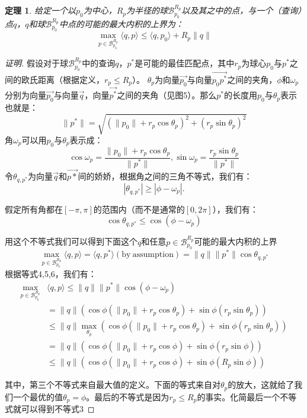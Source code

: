 \documentclass[twocolumn]{article}
\begin{document}
\newtheorem{theorem1}{定理}[section]
\begin{theorem1}
给定一个以$p_0$为中心，$R_p$为半径的球$\mathcal{B}_{p_0}^{R_p}$以及其之中的点，与一个（查询）点$q$，$q$和球$\mathcal{B}_{p_0}^{R_p}$中点的可能的最大内积的上界为：
\begin{equation}
\max_{p \in \mathcal{B}_{p_0}^{R_p}} \langle q,p \rangle \le \langle q,p_0 \rangle + R_p \|q\|
\end{equation}

\end{theorem1}
\begin{proof}[证明]
假设对于球$\mathcal{B}_{p_0}^{R_p}$中的查询$q$，$p^*$是可能的最佳匹配点，其中$r_p$为球心$p_0$与$p^*$之间的欧氏距离（根据定义，$r_p \le R_p$）。
$\theta_p$为向量$\vec{p_0}$与向量$\vec{p_0 p^*}$之间的夹角，$\phi$和$\omega_p$分别为向量$\vec{p_0}$与向量$\vec{q}$，向量$\vec{p^*}$之间的夹角（见图5）。那么$p^*$的长度用$p_0$与$\theta_p$表示也就是：
\begin{equation}
\|p^*\| = \sqrt{(\|p_0\| + r_p\cos\theta_p)^2+(r_p\sin\theta_p)^2}
\end{equation}
角$\omega_p$可以用$p_0$与$\theta_p$表示成：
\begin{equation}
\cos\omega_p = \frac{\|p_0\|+r_p\cos\theta_p}{\|p^*\|},
\sin\omega_p = \frac{r_p\sin\theta_p}{\|p^*\|}
\end{equation}
令$\theta_{q,p^*}$为向量$\vec{q}$和$\vec{p*}$间的娇娇，根据角之间的三角不等式，我们有：
\begin{equation*}
|\theta_{q,p^*}| \ge |\phi - \omega_p|.
\end{equation*}

假定所有角都在$[-\pi, \pi]$的范围内（而不是通常的$[0, 2\pi]$），我们有：
\begin{equation}
\cos\theta_{q,p^*} \le \cos(\phi - \omega_p)
\end{equation}

用这个不等式我们可以得到下面这个$q$和任意$p \in \mathcal{B}_{p_0}^{R_p}$可能的最大内积的上界
\begin{equation*}
\max_{p \in \mathcal{B}_{p_0}^{R_p}}\langle q,p \rangle = \langle q,p^* \rangle(\mathrm{by\ assumption}) = \|q\|\|p^*\|\cos\theta_{q,p^*}
\end{equation*}
根据等式4,5,6，我们有：
\begin{align*}
\max_{p \in \mathcal{B}_{p_0}^{R_p}}&\langle q,p \rangle \le \|q\|\|p^*\|\cos(\phi-\omega_p) \\
 &= \|q\|(\cos\phi(\|p_0\|+r_p\cos\theta_p)+\sin\phi(r_p\sin\theta_p))                       \\
 &\le\|q\|\max_{\theta_p}(\cos\phi(\|p_0\| + r_p\cos\theta_p)+\sin\phi(r_p\sin\theta_p))     \\
 &= \|q\|(\cos\phi(\|p_0\|+r_p\cos\phi)+\sin\phi(r_p\sin\phi))                               \\
 &\le \|q\|(\cos\phi(\|p_0\|+r_p\cos\phi)+\sin\phi(R_p\sin\phi))
\end{align*}

其中，第三个不等式来自最大值的定义。下面的等式来自对$\theta_p$的放大，这就给了我们一个最优的值$\theta_p = \phi$。最后的不等式是因为$r_p \le R_p$的事实。化简最后一个不等式就可以得到不等式3
\end{proof}
\end{document}

